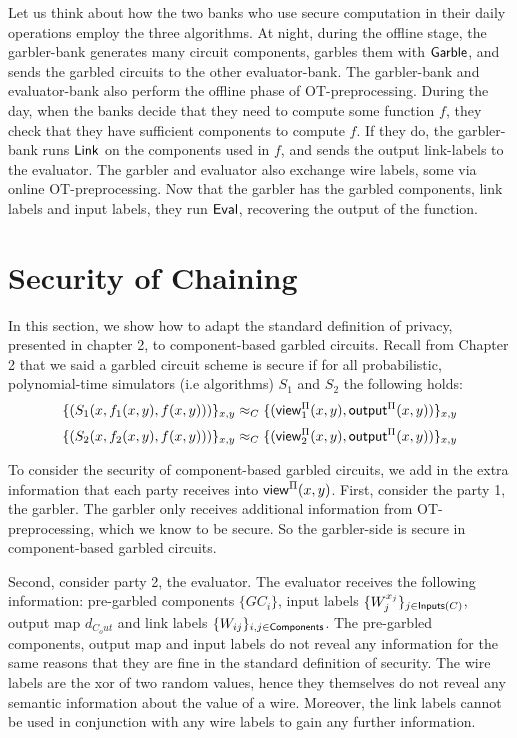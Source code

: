 Let us think about how the two banks who use secure computation in their daily operations employ the three algorithms.
At night, during the offline stage, the garbler-bank generates many circuit components, garbles them with $\sf{Garble}$, and sends the garbled circuits to the other evaluator-bank. 
The garbler-bank and evaluator-bank also perform the offline phase of OT-preprocessing.
During the day, when the banks decide that they need to compute some function $f$, they check that they have sufficient components to compute $f$. 
If they do, the garbler-bank runs $\sf{Link}$ on the components used in $f$, and sends the output link-labels to the evaluator. 
The garbler and evaluator also exchange wire labels, some via online OT-preprocessing. 
Now that the garbler has the garbled components, link labels and input labels, they run $\sf{Eval}$, recovering the output of the function.

\section{Security of Chaining}

In this section, we show how to adapt the standard definition of privacy, presented in chapter 2, to component-based garbled circuits.
Recall from Chapter 2 that we said a garbled circuit scheme is secure if for all probabilistic, polynomial-time simulators (i.e algorithms) $S_1$ and $S_2$ the following holds:
\begin{equation}
    \{(S_1(x, f_1(x,y), f(x,y)))\}_{x,y} \approx_C \{({\sf view}^{\Pi}_1(x,y), {\sf output}^{\Pi}(x,y)) \}_{x,y}
\end{equation}
\begin{equation}
    \{(S_2(x, f_2(x,y), f(x,y)))\}_{x,y} \approx_C \{({\sf view}^{\Pi}_2(x,y), {\sf output}^{\Pi}(x,y)) \}_{x,y}
\end{equation}

To consider the security of component-based garbled circuits, we add in the extra information that each party receives into ${\sf view}^{\Pi}(x,y)$. 
First, consider the party 1, the garbler. 
The garbler only receives additional information from OT-preprocessing, which we know to be secure. 
So the garbler-side is secure in component-based garbled circuits.

Second, consider party 2, the evaluator. 
The evaluator receives the following information: pre-garbled components $\{GC_i\}$, input labels $\{W_j^{x_j}\}_{j \in \textsf{Inputs}(C)}$, output map $d_{C_out}$ and link labels $\{W_{ij}\}_{i,j \in \textsf{Components}}$.
The pre-garbled components, output map and input labels do not reveal any information for the same reasons that they are fine in the standard definition of security.
The wire labels are the xor of two random values, hence they themselves do not reveal any semantic information about the value of a wire. 
Moreover, the link labels cannot be used in conjunction with any wire labels to gain any further information.

